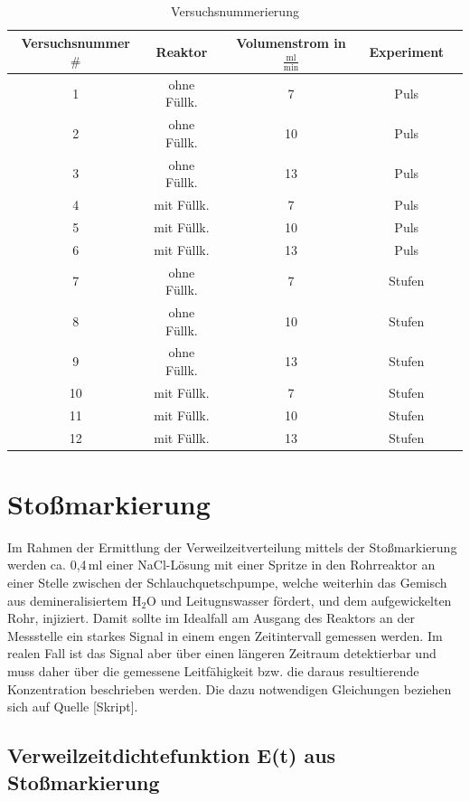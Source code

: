 \documentclass[12pt,liststotoc]{report}
\begin{document}
\begin{table}[H]
\centering
\caption{Versuchsnummerierung}
\begin{tabular}{c|c|c|cc}
\toprule 
Versuchsnummer $\#$ & Reaktor & Volumenstrom in $\frac{\text{ml}}{\text{min}}$ & Experiment \\
\midrule
1 & ohne Füllk.& 7 & Puls \\
2 & ohne Füllk. & 10 & Puls \\
3 & ohne Füllk. & 13 & Puls \\
4 & mit Füllk. & 7 & Puls \\
5 & mit Füllk. & 10 & Puls \\
6 & mit Füllk. & 13 & Puls \\
7 & ohne Füllk. & 7 & Stufen \\
8 & ohne Füllk. & 10 & Stufen \\
9 & ohne Füllk. & 13 & Stufen \\
10 & mit Füllk. & 7 & Stufen\\
11 & mit Füllk. & 10 & Stufen \\
12 & mit Füllk. & 13 & Stufen\\
\bottomrule
\end{tabular}
\label{tab:Versuchsnummerierung}
\end{table}
\noindent


\section{Stoßmarkierung}

Im Rahmen der Ermittlung der Verweilzeitverteilung mittels der Stoßmarkierung werden ca. 0,4\,ml einer NaCl-Lösung mit einer Spritze in den Rohrreaktor an einer Stelle zwischen der Schlauchquetschpumpe, welche weiterhin das Gemisch aus demineralisiertem H$_2$O und Leitugnswasser fördert, und dem aufgewickelten Rohr, injiziert. Damit sollte im Idealfall am Ausgang des Reaktors an der Messstelle ein starkes Signal in einem engen Zeitintervall gemessen werden. Im realen Fall ist das Signal aber über einen längeren Zeitraum detektierbar und muss daher über die gemessene Leitfähigkeit bzw. die daraus resultierende Konzentration beschrieben werden. Die dazu notwendigen Gleichungen beziehen sich auf Quelle [Skript].
 
\subsection{Verweilzeitdichtefunktion E(t) aus Stoßmarkierung}
\end{document}
